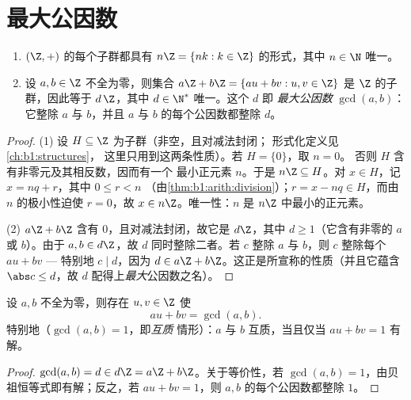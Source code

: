 \section{最大公因数}

\begin{theorem}\label{thm:b1:arith:gcd}
\begin{enumerate}
  \item $(\Z, +)$ 的每个子群都具有 $n\Z = \{nk : k
        \in \Z\}$ 的形式，其中 $n \in \N$ 唯一。
  \item 设 $a, b \in \Z$ 不全为零，则集合 $a\Z + b\Z = \{au +
        bv : u, v \in \Z\}$ 是 $\Z$ 的子群，因此等于
        $d\,\Z$，其中 $d \in \N^*$ 唯一。这个 $d$ 即
        \emph{最大公因数}
        $\gcd(a, b)$：它整除 $a$ 与 $b$，并且
        $a$ 与 $b$ 的每个公因数都整除 $d$。
\end{enumerate}
\end{theorem}

\begin{proof}
(1) 设 $H \subseteq \Z$ 为子群（非空，且对减法封闭；
形式化定义见\cref{ch:b1:structures}，
这里只用到这两条性质）。若 $H = \{0\}$，取 $n = 0$。
否则 $H$ 含有非零元及其相反数，因而有一个
最小正元素 $n$。于是 $n\Z \subseteq H$。对 $x
\in H$，记 $x = nq + r$，其中 $0 \leq r < n$
（由\cref{thm:b1:arith:division}）；$r = x - nq \in H$，而由
$n$ 的极小性迫使 $r = 0$，故 $x \in n\Z$。唯一性：$n$ 是
$n\Z$ 中最小的正元素。

(2) $a\Z + b\Z$ 含有 $0$，且对减法封闭，故它是
$d\Z$，其中 $d \geq 1$（它含有非零的 $a$ 或 $b$）。由于 $a, b
\in d\Z$，故 $d$ 同时整除二者。若 $c$ 整除 $a$ 与 $b$，则 $c$
整除每个 $au + bv$ --- 特别地 $c \mid d$，因为 $d \in a\Z
+ b\Z$。这正是所宣称的性质（并且它蕴含 $\abs c \leq
d$，故 $d$ 配得上\emph{最大}公因数之名）。
\end{proof}

\begin{corollary}[贝祖恒等式]\label{cor:b1:arith:bezout}
设 $a, b$ 不全为零，则存在 $u, v \in \Z$ 使
\[
au + bv = \gcd(a, b) .
\]
特别地（$\gcd(a,b) = 1$，即\emph{互质}
情形）：$a$ 与 $b$ 互质，当且仅当 $au + bv = 1$ 有
解。
\end{corollary}

\begin{proof}
$\gcd(a,b) = d \in d\Z = a\Z + b\Z$。关于等价性，若
$\gcd(a,b) = 1$，由贝祖恒等式即有解；反之，若 $au + bv =
1$，则 $a, b$ 的每个公因数都整除 $1$。
\end{proof}

